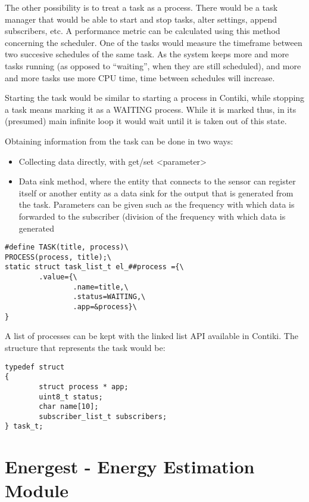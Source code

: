 The other possibility is to treat a task as a process. There would be a task manager that would be
able to start and stop tasks, alter settings, append subscribers, etc. A performance metric can be
calculated using this method concerning the scheduler. One of the tasks would measure the timeframe
between two succesive schedules of the same task.
As the system keeps more and more tasks running (as opposed to “waiting”, when they are still
scheduled), and more and more tasks use more CPU time, time between schedules will increase.

Starting the task would be similar to starting a process in Contiki, while stopping a task means
marking it as a WAITING process. While it is marked thus, in its (presumed) main infinite loop it
would wait until it is taken out of this state.

Obtaining information from the task can be done in two ways:
\begin{itemize}
 \item Collecting data directly, with get/set <parameter>
 \item Data sink method, where the entity that connects to the sensor can register itself or another
entity as a data sink for the output that is generated from the task. Parameters can be given such as the frequency 
with which data is forwarded to the subscriber (division of the frequency with which data is generated
\end{itemize}

\lstset{numbers=none, mathescape=true, nolol=false,caption=Task definition,label=lst:task}
\begin{lstlisting}
#define TASK(title, process)\
PROCESS(process, title);\
static struct task_list_t el_##process ={\
        .value={\
                .name=title,\
                .status=WAITING,\
                .app=&process}\
}
\end{lstlisting}

A list of processes can be kept with the linked list API available in Contiki. The structure that represents the task would be:

\lstset{numbers=none, mathescape=true, nolol=false,caption=Task structure definition,label=lst:taskstruct}
\begin{lstlisting}
typedef struct
{
        struct process * app;
        uint8_t status;
        char name[10];
        subscriber_list_t subscribers;
} task_t;
\end{lstlisting}

\section{Energest - Energy Estimation Module}

